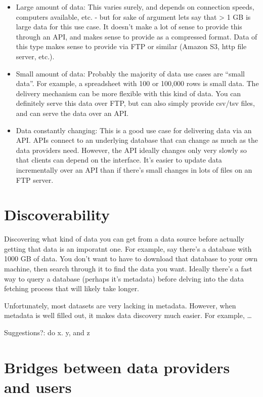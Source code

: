\documentclass[author-year, review, 11pt]{components/elsarticle} %
\def\tightlist{}
\begin{document}
\begin{itemize}
\tightlist
\item
  Large amount of data: This varies surely, and depends on connection
  speeds, computers available, etc. - but for sake of argument lets say
  that \textgreater{} 1 GB is large data for this use case. It doesn't
  make a lot of sense to provide this through an API, and makes sense to
  provide as a compressed format. Data of this type makes sense to
  provide via FTP or similar (Amazon S3, http file server, etc.).
\item
  Small amount of data: Probably the majority of data use cases are
  ``small data''. For example, a spreadsheet with 100 or 100,000 rows is
  small data. The delivery mechanism can be more flexible with this kind
  of data. You can definitely serve this data over FTP, but can also
  simply provide csv/tsv files, and can serve the data over an API.
\item
  Data constantly changing: This is a good use case for delivering data
  via an API. APIs connect to an underlying database that can change as
  much as the data providers need. However, the API ideally changes only
  very slowly so that clients can depend on the interface. It's easier
  to update data incrementally over an API than if there's small changes
  in lots of files on an FTP server.
\end{itemize}

\hypertarget{discoverability}{%
\section{Discoverability}\label{discoverability}}

Discovering what kind of data you can get from a data source before
actually getting that data is an imporatnt one. For example, say there's
a database with 1000 GB of data. You don't want to have to download that
database to your own machine, then search through it to find the data
you want. Ideally there's a fast way to query a database (perhaps it's
metadata) before delving into the data fetching process that will likely
take longer.

Unfortunately, most datasets are very lacking in metadata. However, when
metadata is well filled out, it makes data discovery much easier. For
example, \ldots{}

Suggestions?: do x. y, and z

\hypertarget{bridges-between-data-providers-and-users}{%
\section{Bridges between data providers and
users}\label{bridges-between-data-providers-and-users}}
\end{document}
